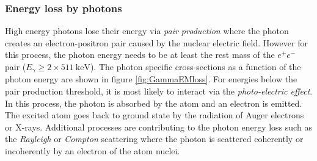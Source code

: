 \subsubsection{Energy loss by photons}

High energy photons lose their energy via \textit{pair production} where the photon creates an electron-positron pair caused by the nuclear electric field. However for this process, the photon energy needs to be at least the rest mass of the $e^+e^-$ pair ($E_{\gamma} \geq 2 \times \SI{511}{\kilo\eV}$). The photon specific cross-sections as a function of the photon energy are shown in figure \ref{fig:GammaEMloss}. For energies below the pair production threshold, it is most likely to interact via the \textit{photo-electric effect}. In this process, the photon is absorbed by the atom and an electron is emitted. The excited atom goes back to ground state by the radiation of Auger electrons or X-rays. Additional processes are contributing to the photon energy loss such as the \textit{Rayleigh} or \textit{Compton} scattering where the photon is scattered coherently or incoherently by an electron of the atom nuclei.

